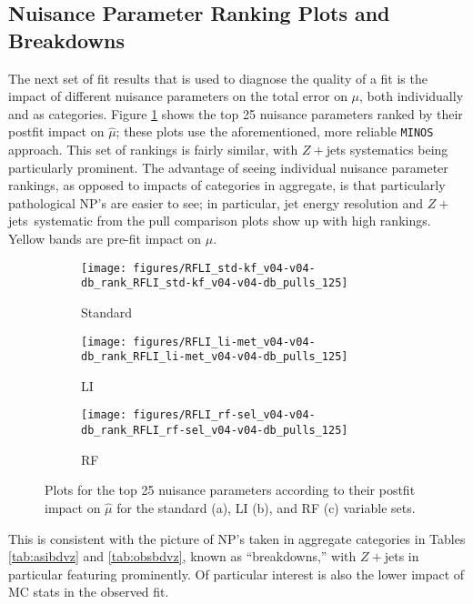 \subsection{Nuisance Parameter Ranking Plots and Breakdowns}
The next set of fit results that is used to diagnose the quality of a fit is the impact of different nuisance parameters on the total error on $\mu$, both individually and as categories.  Figure \ref{fig:nprankingvz} shows the top 25 nuisance parameters ranked by their postfit impact on $\hat{\mu}$; these plots use the aforementioned, more reliable \texttt{MINOS} approach.  This set of rankings is fairly similar, with $Z+$jets systematics being particularly prominent.  The advantage of seeing individual nuisance parameter rankings, as opposed to impacts of categories in aggregate, is that particularly pathological NP's are easier to see; in particular, jet energy resolution and $Z+$jets \ptv\,systematic from the pull comparison plots show up with high rankings.  Yellow bands are pre-fit impact on $\mu$.
\begin{figure}[!htbp]\captionsetup{justification=centering}
  \centering
\begin{subfigure}[t]{0.300000\textwidth}\centering\texttt{[image: figures/RFLI\_std-kf\_v04-v04-db\_rank\_RFLI\_std-kf\_v04-v04-db\_pulls\_125]}\caption{Standard}\end{subfigure}
\begin{subfigure}[t]{0.300000\textwidth}\centering\texttt{[image: figures/RFLI\_li-met\_v04-v04-db\_rank\_RFLI\_li-met\_v04-v04-db\_pulls\_125]}\caption{LI}\end{subfigure}
\begin{subfigure}[t]{0.300000\textwidth}\centering\texttt{[image: figures/RFLI\_rf-sel\_v04-v04-db\_rank\_RFLI\_rf-sel\_v04-v04-db\_pulls\_125]}\caption{RF}\end{subfigure}
  \caption{Plots for the top 25 nuisance parameters according to their postfit impact on $\hat{\mu}$ for the standard (a), LI (b), and RF (c) variable sets.}
  \label{fig:nprankingvz}
\end{figure}

This is consistent with the picture of NP's taken in aggregate categories in Tables \ref{tab:asibdvz} and \ref{tab:obsbdvz}, known as ``breakdowns,'' with $Z+$jets in particular featuring prominently.  Of particular interest is also the lower impact of MC stats in the observed fit.

